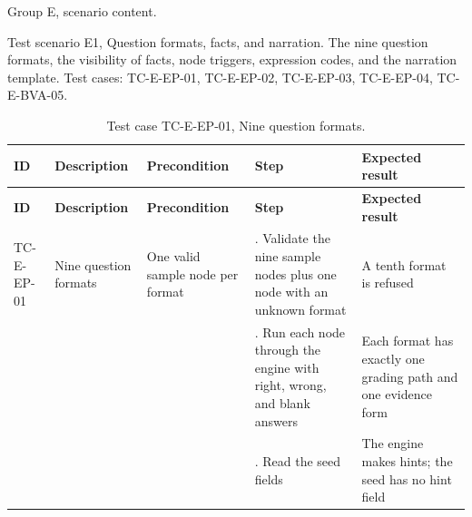 Group E, scenario content.

Test scenario E1, Question formats, facts, and narration. The nine question formats, the visibility of facts, node triggers, expression codes, and the narration template. Test cases: TC-E-EP-01, TC-E-EP-02, TC-E-EP-03, TC-E-EP-04, TC-E-BVA-05.

{\small
\begin{longtable}{|>{\raggedright\arraybackslash}p{}|>{\raggedright\arraybackslash}p{}|>{\raggedright\arraybackslash}p{}|>{\raggedright\arraybackslash}p{}|>{\raggedright\arraybackslash}p{}|}
\caption{Test case TC-E-EP-01, Nine question formats.} \\
\hline
\textbf{ID} & \textbf{Description} & \textbf{Precondition} & \textbf{Step} & \textbf{Expected result} \\ \hline
\endfirsthead
\hline
\textbf{ID} & \textbf{Description} & \textbf{Precondition} & \textbf{Step} & \textbf{Expected result} \\ \hline
\endhead
TC-E-EP-01 & Nine question formats & One valid sample node per format & 1. Validate the nine sample nodes plus one node with an unknown format & A tenth format is refused \\ \hline
 &  &  & 2. Run each node through the engine with right, wrong, and blank answers & Each format has exactly one grading path and one evidence form \\ \hline
 &  &  & 3. Read the seed fields & The engine makes hints; the seed has no hint field \\ \hline
\end{longtable}
}

